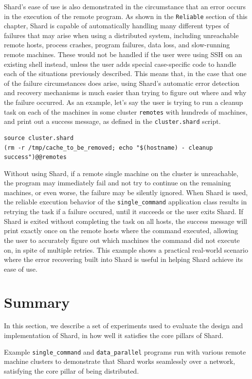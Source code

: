 \documentclass[twoside]{report}
\begin{document}
Shard's ease of use is also demonstrated in the circumstance that an error occurs in the execution of the remote program.
As shown in the \texttt{Reliable} section of this chapter, Shard is capable of automatically handling many different types of failures that may arise when using a distributed system, including unreachable remote hosts, process crashes, program failures, data loss, and slow-running remote machines.
These would not be handled if the user were using SSH on an existing shell instead, unless the user adds special case-specific code to handle each of the situations previously described.
This means that, in the case that one of the failure circumstances does arise, using Shard's automatic error detection and recovery mechanisms is much easier than trying to figure out where and why the failure occurred.
As an example, let's say the user is trying to run a cleanup task on each of the machines in some cluster \texttt{remotes} with hundreds of machines, and print out a success message, as defined in the \texttt{cluster.shard} script.
\begin{lstlisting}[language=Shard]
source cluster.shard
(rm -r /tmp/cache_to_be_removed; echo "$(hostname) - cleanup success")@@remotes
\end{lstlisting}
Without using Shard, if a remote single machine on the cluster is unreachable, the program may immediately fail and not try to continue on the remaining machines, or even worse, the failure may be silently ignored.
When Shard is used, the reliable execution behavior of the \texttt{single\_command} application class results in retrying the task if a failure occured, until it succeeds or the user exits Shard.
If Shard is exited without completing the task on all hosts, the success message will print exactly once on the remote hosts where the command executed, allowing the user to accurately figure out which machines the command did not execute on, in spite of multiple retries.
This example shows a practical real-world scenario where the error recovering built into Shard is useful in helping Shard achieve its ease of use.

\section{Summary}

In this section, we describe a set of experiments used to evaluate the design and implementation of Shard, in how well it satisfies the core pillars of Shard.

Example \texttt{single\_command} and \texttt{data\_parallel} programs run with various remote machine clusters to demonstrate that Shard works seamlessly over a network, satisfying the core pillar of being distributed.
\end{document}
